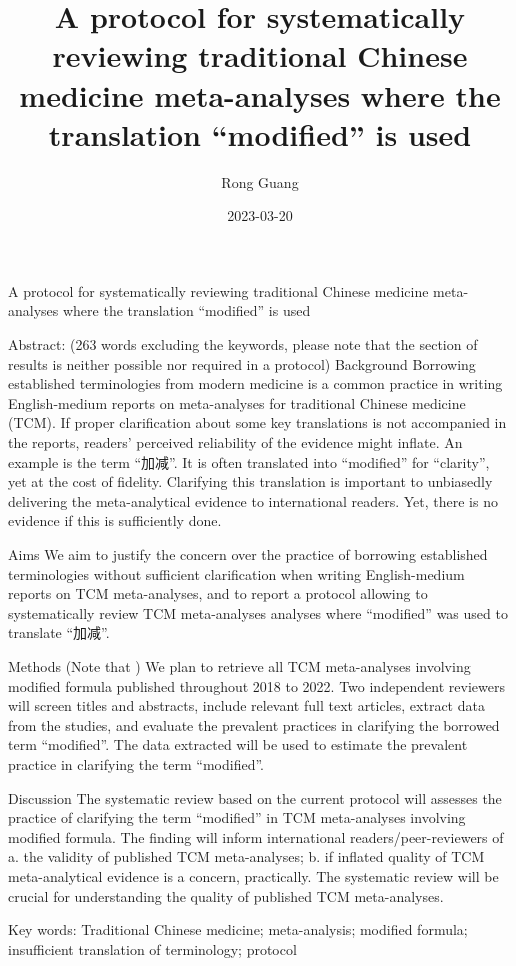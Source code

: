 \documentclass[
]{article}
\title{A protocol for systematically reviewing traditional Chinese medicine meta-analyses where the translation ``modified'' is used}
\author{Rong Guang}
\date{2023-03-20}
\begin{document}
\maketitle

{
\setcounter{tocdepth}{2}
\tableofcontents
}
A protocol for systematically reviewing traditional Chinese medicine meta-analyses where the translation ``modified'' is used

Abstract: (263 words excluding the keywords, please note that the section of results is neither possible nor required in a protocol)
Background
Borrowing established terminologies from modern medicine is a common practice in writing English-medium reports on meta-analyses for traditional Chinese medicine (TCM). If proper clarification about some key translations is not accompanied in the reports, readers' perceived reliability of the evidence might inflate. An example is the term ``加减''. It is often translated into ``modified'' for ``clarity'', yet at the cost of fidelity. Clarifying this translation is important to unbiasedly delivering the meta-analytical evidence to international readers. Yet, there is no evidence if this is sufficiently done.

Aims
We aim to justify the concern over the practice of borrowing established terminologies without sufficient clarification when writing English-medium reports on TCM meta-analyses, and to report a protocol allowing to systematically review TCM meta-analyses analyses where ``modified'' was used to translate ``加减''.

Methods (Note that )
We plan to retrieve all TCM meta-analyses involving modified formula published throughout 2018 to 2022. Two independent reviewers will screen titles and abstracts, include relevant full text articles, extract data from the studies, and evaluate the prevalent practices in clarifying the borrowed term ``modified''. The data extracted will be used to estimate the prevalent practice in clarifying the term ``modified''.

Discussion
The systematic review based on the current protocol will assesses the practice of clarifying the term ``modified'' in TCM meta-analyses involving modified formula. The finding will inform
international readers/peer-reviewers of a. the validity of published TCM meta-analyses; b. if inflated quality of TCM meta-analytical evidence is a concern, practically. The systematic review will be crucial for understanding the quality of published TCM meta-analyses.

Key words: Traditional Chinese medicine; meta-analysis; modified formula; insufficient translation of terminology; protocol
\end{document}
